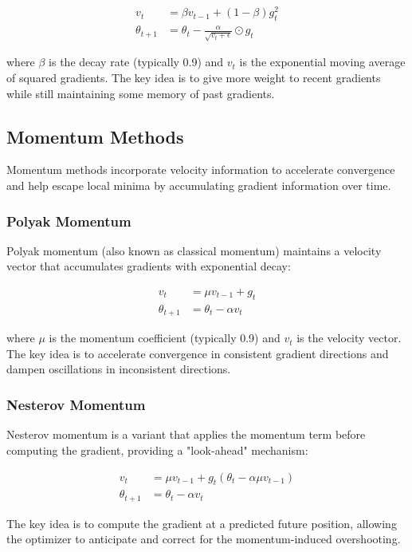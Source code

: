 \documentclass[12pt]{article}
\begin{document}
\begin{align}
v_t &= \beta v_{t-1} + (1-\beta) g_t^2 \\
\theta_{t+1} &= \theta_t - \frac{\alpha}{\sqrt{v_t + \epsilon}} \odot g_t
\end{align}

where $\beta$ is the decay rate (typically 0.9) and $v_t$ is the exponential moving average of squared gradients. The key idea is to give more weight to recent gradients while still maintaining some memory of past gradients.

\subsection{Momentum Methods}

Momentum methods incorporate velocity information to accelerate convergence and help escape local minima by accumulating gradient information over time.

\subsubsection{Polyak Momentum}

Polyak momentum (also known as classical momentum) maintains a velocity vector that accumulates gradients with exponential decay:

\begin{align}
v_t &= \mu v_{t-1} + g_t \\
\theta_{t+1} &= \theta_t - \alpha v_t
\end{align}

where $\mu$ is the momentum coefficient (typically 0.9) and $v_t$ is the velocity vector. The key idea is to accelerate convergence in consistent gradient directions and dampen oscillations in inconsistent directions.

\subsubsection{Nesterov Momentum}

Nesterov momentum is a variant that applies the momentum term before computing the gradient, providing a "look-ahead" mechanism:

\begin{align}
v_t &= \mu v_{t-1} + g_t(\theta_t - \alpha \mu v_{t-1}) \\
\theta_{t+1} &= \theta_t - \alpha v_t
\end{align}

The key idea is to compute the gradient at a predicted future position, allowing the optimizer to anticipate and correct for the momentum-induced overshooting.
\end{document}
